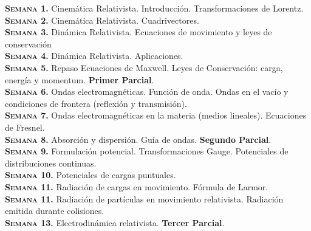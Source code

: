 \documentclass[letterpaper,10pt,onecolumn]{article}
\begin{document}
\noindent\normalsize\textbf{\textsc{Semana 1.}} Cinem\'atica
Relativista. Introducci\'on. Transformaciones de Lorentz.\\[-0.3cm]   

\noindent\textbf{\textsc{Semana 2.}} Cinem\'atica
Relativista. Cuadrivectores. \\[-0.3cm]   

\noindent\textbf{\textsc{Semana 3.}} Din\'amica 
Relativista. Ecuaciones de movimiento y leyes de conservaci\'on
\\[-0.3cm]  

\noindent\textbf{\textsc{Semana 4.}} Din\'amica 
Relativista. Aplicaciones. \\[-0.3cm]  

\noindent\textbf{\textsc{Semana 5.}} Repaso Ecuaciones de
Maxwell. Leyes de Conservaci\'on: carga, energ\'ia y
momentum. {\textbf{Primer Parcial}.}\\[-0.3cm]  

\noindent\textbf{\textsc{Semana 6.}} Ondas
electromagn\'eticas. Funci\'on de onda. Ondas en el vac\'io y
condiciones de frontera (reflexi\'on y transmisi\'on).\\[-0.3cm]  

\noindent\textbf{\textsc{Semana 7.}} Ondas electromagn\'eticas en
la materia (medios lineales). Ecuaciones de Fresnel.\\[-0.3cm] 

\noindent\textbf{\textsc{Semana 8.}} Absorci\'on y
dispersi\'on. Gu\'ia de ondas. {\textbf{Segundo Parcial}.}\\[-0.3cm]

\noindent\textbf{\textsc{Semana 9.}} Formulaci\'on
potencial. Transformaciones Gauge. Potenciales de distribuciones
continuas. \\[-0.3cm] 

\noindent\textbf{\textsc{Semana 10.}} Potenciales de cargas
puntuales. \\[-0.3cm]  

\noindent\textbf{\textsc{Semana 11.}} Radiaci\'on de cargas en
movimiento.  F\'ormula de Larmor. \\[-0.3cm]  

\noindent\textbf{\textsc{Semana 11.}} Radiaci\'on de part\'iculas en
movimiento relativista. Radiaci\'on emitida durante colisiones. \\[-0.3cm]  

\noindent\textbf{\textsc{Semana 13.}} Electrodin\'amica
relativista. {\textbf{Tercer Parcial}.}\\[-0.3cm] 
\end{document}
